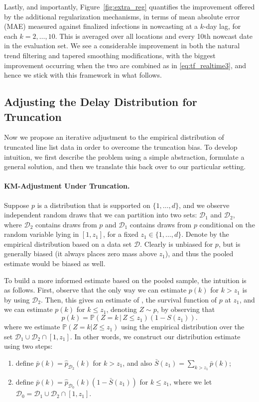 \documentclass[sts]{imsart}
\def\P{\mathbb{P}}
\def\hp{\hat{p}}
\def\bp{\bar{p}}
\def\bS{\bar{S}}
\def\D{\mathcal{D}}
\theoremstyle{plain}
\theoremstyle{definition}
\theoremstyle{remark}
\begin{document}
Lastly, and importantly, Figure~\ref{fig:extra_reg} quantifies the improvement
offered by the additional regularization mechanisms, in terms of mean absolute
error (MAE) measured against finalized infections in nowcasting at a $k$-day
lag, for each $k=2,\ldots,10$. This is averaged over all locations and every
10th nowcast date in the evaluation set. We see a considerable improvement in 
both the natural trend filtering and tapered smoothing modifications, with the
biggest improvement occurring when the two are combined as in
\eqref{eq:tf_realtime3}, and hence we stick with this framework in what follows. 

\subsection{Adjusting the Delay Distribution for Truncation}   
\label{sec:delay_adjust}

Now we propose an iterative adjustment to the empirical distribution of
truncated line list data in order to overcome the truncation bias. To develop
intuition, we first describe the problem using a simple abstraction, formulate a
general solution, and then we translate this back over to our particular
setting.   

\smallskip
\paragraph*{KM-Adjustment Under Truncation.}

Suppose $p$ is a distribution that is supported on $\{1,\ldots,d\}$, and we observe
independent random draws that we can partition into two sets: $\D_1$ and $\D_2$,
where $\D_2$ contains draws from $p$ and $\D_1$ contains draws from $p$
conditional on the random variable lying in $[1,z_1]$, for a fixed $z_1 \in
\{1,\ldots,d\}$. Denote by \smash{$\hp_\D$} the empirical distribution based on
a data set $\D$. Clearly \smash{$\hp_{\D_2}$} is unbiased for $p$, but
\smash{$\hp_{\D_1}$} is generally biased (it always places zero mass above
$z_1$), and thus the pooled estimate \smash{$\hp_{\D_1 \cup \D_2}$} would be
biased as well.

To build a more informed estimate based on the pooled sample, the intuition 
is as follows. First, observe that the only way we can estimate $p(k)$ for $k > 
z_1$ is by using $\D_2$. Then, this gives an estimate of , the survival function of $p$ at $z_1$, and we can
estimate $p(k)$ for $k \leq z_1$, denoting $Z \sim p$, by observing that  
$$
p(k) = \P(Z = k \,|\, Z \leq z_1) (1-S(z_1)).
$$
where we estimate $\P(Z = k | Z \leq z_1)$ using the empirical distribution     
over the set $\D_1 \cup \D_2 \cap [1, z_1]$. In other words, we construct our   
distribution estimate \smash{$\bp$} using two steps:     
\begin{enumerate}
\item define $\bp(k) = \hp_{\D_2}(k)$ for $k > z_1$, and also $\bS(z_1) =
  \sum_{k >  z_1} \bp(k)$;
\item define $\bp(k) = \hp_{\D_0}(k) (1-\bS(z_1))$ for $k \leq z_1$, where we
  let $\D_0 = \D_1 \cup \D_2 \cap [1, z_1]$. 
\end{enumerate}
\end{document}
